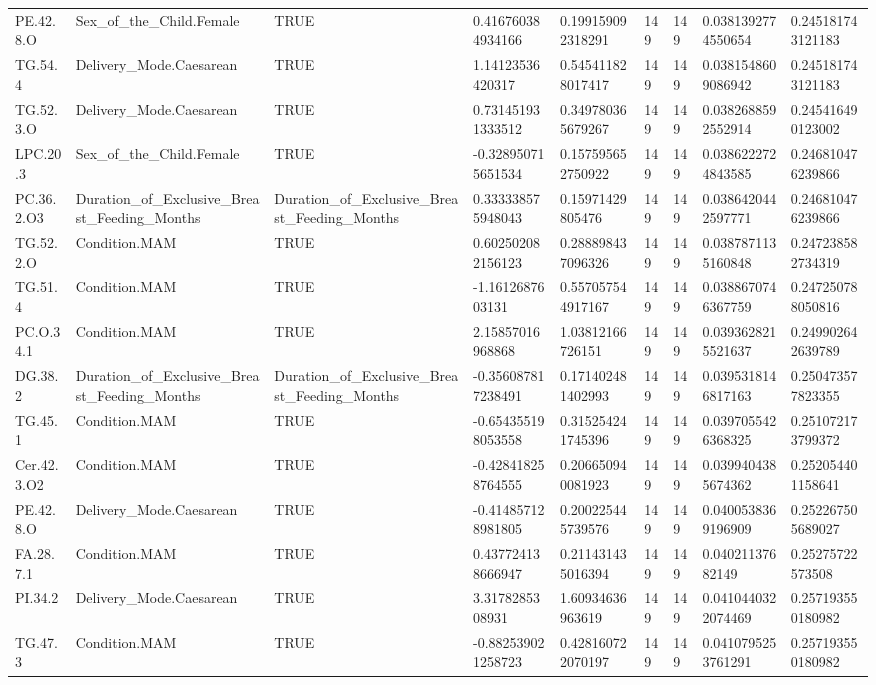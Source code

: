 \begin{longtable}{lllllllll}
PE.42.8.O & Sex\_of\_the\_Child.Female & TRUE & 0.416760384934166 & 0.199159092318291 & 149 & 149 & 0.0381392774550654 & 0.245181743121183 \\
TG.54.4 & Delivery\_Mode.Caesarean & TRUE & 1.14123536420317 & 0.545411828017417 & 149 & 149 & 0.0381548609086942 & 0.245181743121183 \\
TG.52.3.O & Delivery\_Mode.Caesarean & TRUE & 0.731451931333512 & 0.349780365679267 & 149 & 149 & 0.0382688592552914 & 0.245416490123002 \\
LPC.20.3 & Sex\_of\_the\_Child.Female & TRUE & -0.328950715651534 & 0.157595652750922 & 149 & 149 & 0.0386222724843585 & 0.246810476239866 \\
PC.36.2.O3 & Duration\_of\_Exclusive\_Breast\_Feeding\_Months & Duration\_of\_Exclusive\_Breast\_Feeding\_Months & 0.333338575948043 & 0.15971429805476 & 149 & 149 & 0.0386420442597771 & 0.246810476239866 \\
TG.52.2.O & Condition.MAM & TRUE & 0.602502082156123 & 0.288898437096326 & 149 & 149 & 0.0387871135160848 & 0.247238582734319 \\
TG.51.4 & Condition.MAM & TRUE & -1.1612687603131 & 0.557057544917167 & 149 & 149 & 0.0388670746367759 & 0.247250788050816 \\
PC.O.34.1 & Condition.MAM & TRUE & 2.15857016968868 & 1.03812166726151 & 149 & 149 & 0.0393628215521637 & 0.249902642639789 \\
DG.38.2 & Duration\_of\_Exclusive\_Breast\_Feeding\_Months & Duration\_of\_Exclusive\_Breast\_Feeding\_Months & -0.356087817238491 & 0.171402481402993 & 149 & 149 & 0.0395318146817163 & 0.250473577823355 \\
TG.45.1 & Condition.MAM & TRUE & -0.654355198053558 & 0.315254241745396 & 149 & 149 & 0.0397055426368325 & 0.251072173799372 \\
Cer.42.3.O2 & Condition.MAM & TRUE & -0.428418258764555 & 0.206650940081923 & 149 & 149 & 0.0399404385674362 & 0.252054401158641 \\
PE.42.8.O & Delivery\_Mode.Caesarean & TRUE & -0.414857128981805 & 0.200225445739576 & 149 & 149 & 0.0400538369196909 & 0.252267505689027 \\
FA.28.7.1 & Condition.MAM & TRUE & 0.437724138666947 & 0.211431435016394 & 149 & 149 & 0.04021137682149 & 0.25275722573508 \\
PI.34.2 & Delivery\_Mode.Caesarean & TRUE & 3.3178285308931 & 1.60934636963619 & 149 & 149 & 0.0410440322074469 & 0.257193550180982 \\
TG.47.3 & Condition.MAM & TRUE & -0.882539021258723 & 0.428160722070197 & 149 & 149 & 0.0410795253761291 & 0.257193550180982 \\

\end{longtable}
